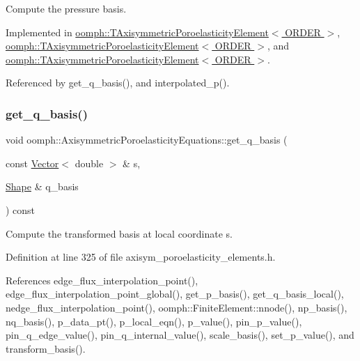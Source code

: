 Compute the pressure basis. 



Implemented in \hyperlink{classoomph_1_1TAxisymmetricPoroelasticityElement_a12e958b84334c6e47e0511ff1f08f13d}{oomph\+::\+T\+Axisymmetric\+Poroelasticity\+Element$<$ O\+R\+D\+E\+R $>$}, \hyperlink{classoomph_1_1TAxisymmetricPoroelasticityElement_abb0d8bbdf015bd4ef8b1d8637f93bc6d}{oomph\+::\+T\+Axisymmetric\+Poroelasticity\+Element$<$ O\+R\+D\+E\+R $>$}, and \hyperlink{classoomph_1_1TAxisymmetricPoroelasticityElement_ae2b824db26087cecbb5a20d14931354a}{oomph\+::\+T\+Axisymmetric\+Poroelasticity\+Element$<$ O\+R\+D\+E\+R $>$}.



Referenced by get\+\_\+q\+\_\+basis(), and interpolated\+\_\+p().

\mbox{\label{classoomph_1_1AxisymmetricPoroelasticityEquations_a710ff51050c22c6f15941d62ab15b3fa}} 
\subsubsection{\texorpdfstring{get\+\_\+q\+\_\+basis()}{get\_q\_basis()}}
{\footnotesize\ttfamily void oomph\+::\+Axisymmetric\+Poroelasticity\+Equations\+::get\+\_\+q\+\_\+basis (\begin{DoxyParamCaption}\item[{const \hyperlink{classoomph_1_1Vector}{Vector}$<$ double $>$ \&}]{s,  }\item[{\hyperlink{classoomph_1_1Shape}{Shape} \&}]{q\+\_\+basis }\end{DoxyParamCaption}) const\hspace{0.3cm}{\ttfamily [inline]}}



Compute the transformed basis at local coordinate s. 



Definition at line 325 of file axisym\+\_\+poroelasticity\+\_\+elements.\+h.



References edge\+\_\+flux\+\_\+interpolation\+\_\+point(), edge\+\_\+flux\+\_\+interpolation\+\_\+point\+\_\+global(), get\+\_\+p\+\_\+basis(), get\+\_\+q\+\_\+basis\+\_\+local(), nedge\+\_\+flux\+\_\+interpolation\+\_\+point(), oomph\+::\+Finite\+Element\+::nnode(), np\+\_\+basis(), nq\+\_\+basis(), p\+\_\+data\+\_\+pt(), p\+\_\+local\+\_\+eqn(), p\+\_\+value(), pin\+\_\+p\+\_\+value(), pin\+\_\+q\+\_\+edge\+\_\+value(), pin\+\_\+q\+\_\+internal\+\_\+value(), scale\+\_\+basis(), set\+\_\+p\+\_\+value(), and transform\+\_\+basis().



